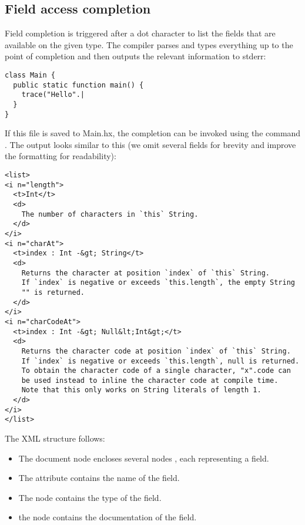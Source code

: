 \subsection{Field access completion}
\label{cr-completion-field-access}

Field completion is triggered after a dot  character to list the fields that are available on the given type. The compiler parses and types everything up to the point of completion and then outputs the relevant information to stderr:

\begin{lstlisting}
class Main {
  public static function main() {
    trace("Hello".|
  }
}
\end{lstlisting}

If this file is saved to Main.hx, the completion can be invoked using the command . The output looks similar to this (we omit several fields for brevity and improve the formatting for readability):

\begin{lstlisting}
<list>
<i n="length">
  <t>Int</t>
  <d>
    The number of characters in `this` String.
  </d>
</i>
<i n="charAt">
  <t>index : Int -&gt; String</t>
  <d>
    Returns the character at position `index` of `this` String.
    If `index` is negative or exceeds `this.length`, the empty String
    "" is returned.
  </d>
</i>
<i n="charCodeAt">
  <t>index : Int -&gt; Null&lt;Int&gt;</t>
  <d>
    Returns the character code at position `index` of `this` String.
    If `index` is negative or exceeds `this.length`, null is returned.
    To obtain the character code of a single character, "x".code can
    be used instead to inline the character code at compile time.
    Note that this only works on String literals of length 1.
  </d>
</i>
</list>
\end{lstlisting}

The XML structure follows:

\begin{itemize}
    \item The document node  encloses several nodes , each representing a field.
    \item The  attribute contains the name of the field.
    \item The  node contains the type of the field.
    \item the  node contains the documentation of the field.
\end{itemize}

